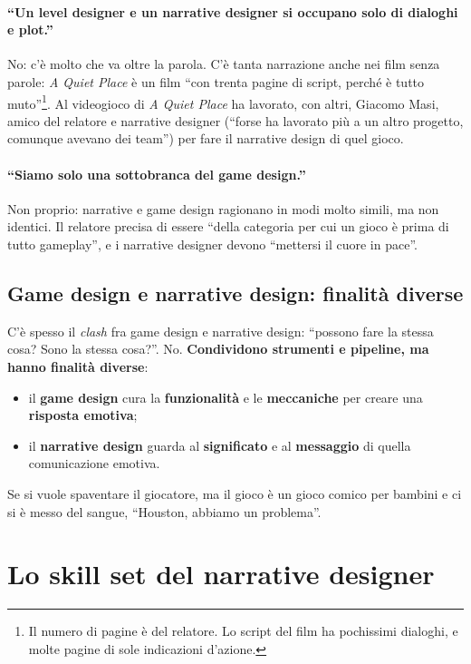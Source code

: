\paragraph{``Un level designer e un narrative designer si occupano solo di
dialoghi e plot.''} No: c'è molto che va oltre la parola. C'è tanta narrazione
anche nei film senza parole: \emph{A Quiet Place} è un film ``con trenta
pagine di script, perché è tutto muto''\footnote{Il numero di pagine è del
relatore. Lo script del film ha pochissimi dialoghi, e molte pagine di sole
indicazioni d'azione.}. Al videogioco di \emph{A Quiet Place} ha lavorato,
con altri, Giacomo Masi, amico del relatore e narrative designer (``forse ha
lavorato più a un altro progetto, comunque avevano dei team'') per fare il
narrative design di quel gioco.

\paragraph{``Siamo solo una sottobranca del game design.''} Non proprio:
narrative e game design ragionano in modi molto simili, ma non identici. Il
relatore precisa di essere ``della categoria per cui un gioco è prima di tutto
gameplay'', e i narrative designer devono ``mettersi il cuore in pace''.

\subsection{Game design e narrative design: finalità diverse}

C'è spesso il \emph{clash} fra game design e narrative design: ``possono fare
la stessa cosa? Sono la stessa cosa?''. No. \textbf{Condividono strumenti e
pipeline, ma hanno finalità diverse}:
\begin{itemize}
  \item il \textbf{game design} cura la \textbf{funzionalità} e le
        \textbf{meccaniche} per creare una \textbf{risposta emotiva};
  \item il \textbf{narrative design} guarda al \textbf{significato} e al
        \textbf{messaggio} di quella comunicazione emotiva.
\end{itemize}
Se si vuole spaventare il giocatore, ma il gioco è un gioco comico per
bambini e ci si è messo del sangue, ``Houston, abbiamo un problema''.

\section{Lo skill set del narrative designer}
\label{p3:sec:skill}

